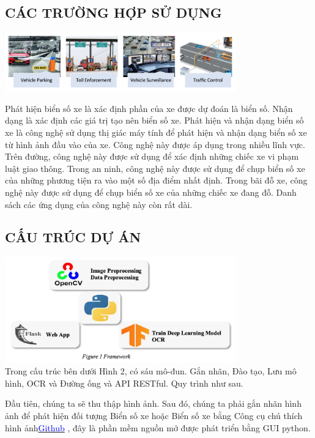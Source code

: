 \documentclass{article}
\begin{document}
\subsection{CÁC TRƯỜNG HỢP SỬ DỤNG}
\includegraphics[width=10cm]{img/img1/Notebook2.png}

Phát hiện biển số xe là xác định phần của xe được dự đoán là biển số. Nhận dạng là xác định các giá trị tạo nên biển số xe. Phát hiện và nhận dạng biển số xe là công nghệ sử dụng thị giác máy tính để phát hiện và nhận dạng biển số xe từ hình ảnh đầu vào của xe. Công nghệ này được áp dụng trong nhiều lĩnh vực. Trên đường, công nghệ này được sử dụng để xác định những chiếc xe vi phạm luật giao thông. Trong an ninh, công nghệ này được sử dụng để chụp biển số xe của những phương tiện ra vào một số địa điểm nhất định. Trong bãi đỗ xe, công nghệ này được sử dụng để chụp biển số xe của những chiếc xe đang đỗ. Danh sách các ứng dụng của công nghệ này còn rất dài.

\subsection{CẤU TRÚC DỰ ÁN}

\includegraphics[width=10cm]{img/img1/Notebook3.png}\\
Trong cấu trúc bên dưới Hình 2, có sáu mô-đun. Gắn nhãn, Đào tạo, Lưu mô hình, OCR và Đường ống và API RESTful. Quy trình như sau.

Đầu tiên, chúng ta sẽ thu thập hình ảnh. Sau đó, chúng ta phải gắn nhãn hình ảnh để phát hiện đối tượng Biển số xe hoặc Biển số xe bằng Công cụ chú thích hình ảnh\href{https://github.com/Asikpalysik/Automatic-License-Plate-Detection/tree/main/labelImg-master}{\textcolor{blue}{Github}} , đây là phần mềm nguồn mở được phát triển bằng GUI python. 
\end{document}
